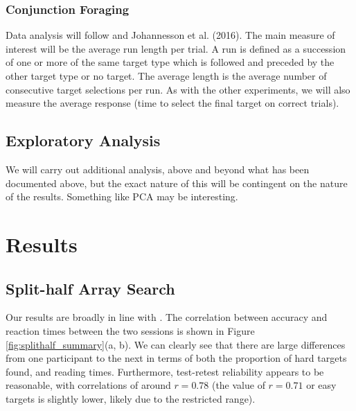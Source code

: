 \documentclass[]{rsos}%
\begin{document}
\subsubsection{Conjunction Foraging}

Data analysis will follow \cite{kristjansson2014} and Johannesson et al. (2016). The main measure of interest will be the average run length per trial. A run is defined as a succession of one or more of the same target type which is followed and preceded by the other target type or no target. The average length is the average number of consecutive target selections per run. As with the other experiments, we will also measure the average response (time to select the final target on correct trials).

\subsubsection{}


\subsection{Exploratory Analysis}

We will carry out additional analysis, above and beyond what has been documented above, but the exact nature of this will be contingent on the nature of the results. Something like PCA may be interesting. 

\section{Results}

\subsection{Split-half Array Search}
Our results are broadly in line with \cite{nowakowsak2017}. The correlation between accuracy and reaction times between the two sessions is shown in Figure \ref{fig:splithalf_summary}(a, b). We can clearly see that there are large differences from one participant to the next in terms of both the proportion of hard targets found, and reading times. Furthermore, test-retest reliability appears to be reasonable, with correlations of around $r = 0.78$ (the value of $r = 0.71$ or easy targets is slightly lower, likely due to the restricted range).
\end{document}
